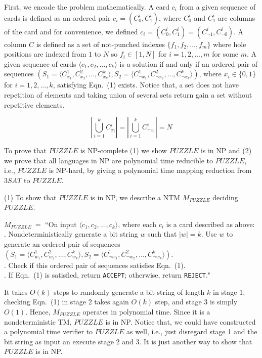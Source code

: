 \documentclass[12pt]{article}
\begin{document}
First, we encode the problem mathematically. A card $c_i$ from a given sequence of cards is defined as an ordered pair $c_i = (C^i_0, C^i_1)$, where $C^i_0$ and $C^i_1$ are columns of the card and for convenience, we defined $c_i = (C^i_0, C^i_1) = (C^i_{\neg1}, C^i_{\neg0})$. A column $C$ is defined as a set of not-punched indexes $\{f_1, f_2, \ldots, f_m\}$ where hole positions are indexed from $1$ to $N$ so $f_i \in [1, N]$ for $i = 1, 2, \ldots, m$ for some $m$.  A given sequence of cards $\langle c_1, c_2, \ldots, c_k \rangle$ is a solution if and only if an ordered pair of sequences $(S_1 = \langle C^1_{x_1}, C^2_{x_2}, \ldots, C^k_{x_k} \rangle, S_2 = \langle C^1_{\neg x_1}, C^2_{\neg x_2}, \ldots, C^k_{\neg x_k} \rangle)$, where $x_i \in \{0 ,1\}$ for $i = 1, 2, \ldots, k$, satisfying Eqn.~(1) exists. Notice that, a set does not have repetition of elements and taking union of several sets return gain a set without repetitive elements.

\begin{equation}
\left|\bigcup_{i = 1}^{k} C^i_{x_i}\right| = \left|\bigcup_{i = 1}^{k} C^i_{\neg x_i}\right| = N
\end{equation}

To prove that $PUZZLE$ is NP-complete (1) we show $PUZZLE$ is in NP and (2) we prove that all languages in NP are polynomial time reducible to $PUZZLE$, i.e., $PUZZLE$ is NP-hard, by giving a polynomial time mapping reduction from $3SAT$ to $PUZZLE$.

(1) To show that $PUZZLE$ is in NP, we describe a NTM $M_{PUZZLE}$ deciding $PUZZLE$.

$M_{PUZZLE} \ =$ ``On input $\langle c_1, c_2, \ldots, c_k \rangle$, where each $c_i$ is a card described as above:\\
	\indent{}. Nondeterministically generate a bit string $w$ such that $|w| = k$. Use $w$ to generate an
	\indent\indent ordered pair of sequences $(S_1 = \langle C^1_{w_1}, C^2_{w_2}, \ldots, C^k_{w_k} \rangle, S_2 = \langle C^1_{\neg w_1}, C^2_{\neg w_2}, \ldots, C^k_{\neg w_k} \rangle)$.\\
	\indent{}. Check if this ordered pair of sequences satisfies Eqn.~(1).\\
	\indent{}. If Eqn.~(1) is satisfied, return \texttt{ACCEPT}; otherwise, return \texttt{REJECT}."

It takes $O(k)$ steps to randomly generate a bit string of length $k$ in stage 1, checking Eqn.~(1) in stage 2 takes again $O(k)$ step, and stage 3 is simply $O(1)$. Hence, $M_{PUZZLE}$ operates in polynomial time. Since it is a nondeterministic TM, $PUZZLE$ is in NP. Notice that, we could have constructed a polynomial time verifier to $PUZZLE$ as well, i.e., just disregard stage 1 and the bit string as input an execute stage 2 and 3. It is just another way to show that $PUZZLE$ is in NP.
\end{document}
